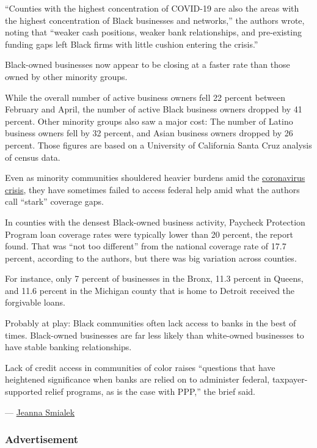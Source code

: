 ``Counties with the highest concentration of COVID-19 are also the areas
with the highest concentration of Black businesses and networks,'' the
authors wrote, noting that ``weaker cash positions, weaker bank
relationships, and pre-existing funding gaps left Black firms with
little cushion entering the crisis.''

Black-owned businesses now appear to be closing at a faster rate than
those owned by other minority groups.

While the overall number of active business owners fell 22 percent
between February and April, the number of active Black business owners
dropped by 41 percent. Other minority groups also saw a major cost: The
number of Latino business owners fell by 32 percent, and Asian business
owners dropped by 26 percent. Those figures are based on a University of
California Santa Cruz analysis of census data.

Even as minority communities shouldered heavier burdens amid the
\href{https://www.nytimes.com/2020/04/07/us/coronavirus-race.html}{coronavirus
crisis}, they have sometimes failed to access federal help amid what the
authors call ``stark'' coverage gaps.

In counties with the densest Black-owned business activity, Paycheck
Protection Program loan coverage rates were typically lower than 20
percent, the report found. That was ``not too different'' from the
national coverage rate of 17.7 percent, according to the authors, but
there was big variation across counties.

For instance, only 7 percent of businesses in the Bronx, 11.3 percent in
Queens, and 11.6 percent in the Michigan county that is home to Detroit
received the forgivable loans.

Probably at play: Black communities often lack access to banks in the
best of times. Black-owned businesses are far less likely than
white-owned businesses to have stable banking relationships.

Lack of credit access in communities of color raises ``questions that
have heightened significance when banks are relied on to administer
federal, taxpayer-supported relief programs, as is the case with PPP,''
the brief said.

--- \href{https://www.nytimes.com/by/jeanna-smialek}{Jeanna Smialek}

\hypertarget{advertisement}{%
\subsubsection{Advertisement}\label{advertisement}}

